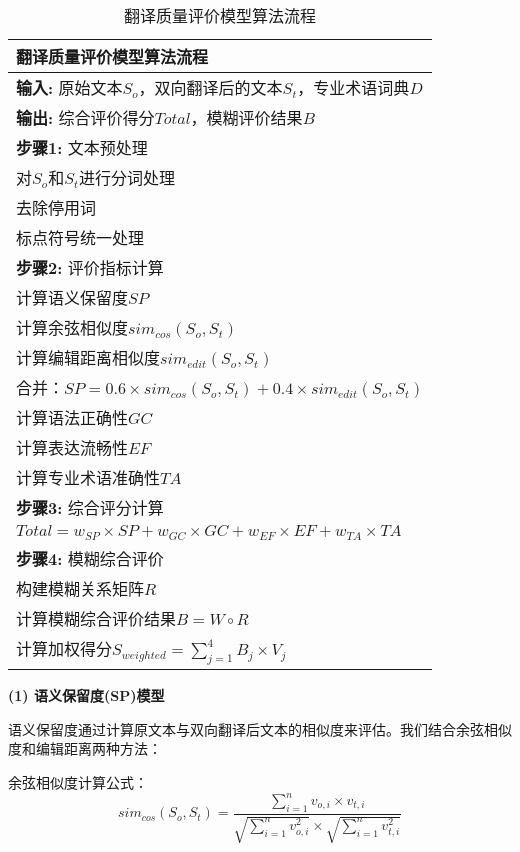 \documentclass[bwprint]{cumcmthesis}
\begin{document}
\begin{table}[H]
\centering
\caption{翻译质量评价模型算法流程}
\begin{tabularx}{\textwidth}{X}
\toprule
\textbf{翻译质量评价模型算法流程} \\
\midrule
\textbf{输入:} 原始文本$S_o$，双向翻译后的文本$S_t$，专业术语词典$D$ \\
\textbf{输出:} 综合评价得分$Total$，模糊评价结果$B$ \\
\textbf{步骤1:} 文本预处理 \\
\quad 对$S_o$和$S_t$进行分词处理 \\
\quad 去除停用词 \\
\quad 标点符号统一处理 \\
\textbf{步骤2:} 评价指标计算 \\
\quad 计算语义保留度$SP$ \\
\quad \quad 计算余弦相似度$sim_{cos}(S_o, S_t)$ \\
\quad \quad 计算编辑距离相似度$sim_{edit}(S_o, S_t)$ \\
\quad \quad 合并：$SP = 0.6 \times sim_{cos}(S_o, S_t) + 0.4 \times sim_{edit}(S_o, S_t)$ \\
\quad 计算语法正确性$GC$ \\
\quad 计算表达流畅性$EF$ \\
\quad 计算专业术语准确性$TA$ \\
\textbf{步骤3:} 综合评分计算 \\
\quad $Total = w_{SP} \times SP + w_{GC} \times GC + w_{EF} \times EF + w_{TA} \times TA$ \\
\textbf{步骤4:} 模糊综合评价 \\
\quad 构建模糊关系矩阵$R$ \\
\quad 计算模糊综合评价结果$B = W \circ R$ \\
\quad 计算加权得分$S_{weighted} = \sum_{j=1}^4 B_j \times V_j$ \\
\bottomrule
\end{tabularx}
\label{tab:评价模型算法}
\end{table}

\textbf{(1) 语义保留度(SP)模型}

语义保留度通过计算原文本与双向翻译后文本的相似度来评估。我们结合余弦相似度和编辑距离两种方法：

余弦相似度计算公式：
\begin{equation}
sim_{cos}(S_o, S_t) = \frac{\sum_{i=1}^{n} v_{o,i} \times v_{t,i}}{\sqrt{\sum_{i=1}^{n} v_{o,i}^2} \times \sqrt{\sum_{i=1}^{n} v_{t,i}^2}}
\end{equation}
\end{document}

